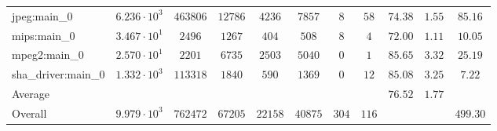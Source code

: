 \begin{tabular}{|l|c|c|c|c|c|c|c|c|c|c|}
jpeg:main\_0            & $ 6.236 \cdot 10^{3} $ & $ 463806 $ & $ 12786 $ & $ 4236  $ & $ 7857  $ & $ 8   $ & $ 58  $ & $ 74.38       $ & $ 1.55    $ & $ 85.16   $ \\
mips:main\_0            & $ 3.467 \cdot 10^{1} $ & $ 2496   $ & $ 1267  $ & $ 404   $ & $ 508   $ & $ 8   $ & $ 4   $ & $ 72.00       $ & $ 1.11    $ & $ 10.05   $ \\
mpeg2:main\_0           & $ 2.570 \cdot 10^{1} $ & $ 2201   $ & $ 6735  $ & $ 2503  $ & $ 5040  $ & $ 0   $ & $ 1   $ & $ 85.65       $ & $ 3.32    $ & $ 25.19   $ \\
sha\_driver:main\_0     & $ 1.332 \cdot 10^{3} $ & $ 113318 $ & $ 1840  $ & $ 590   $ & $ 1369  $ & $ 0   $ & $ 12  $ & $ 85.08       $ & $ 3.25    $ & $ 7.22    $ \\
\hline
Average                 & $                    $ & $        $ & $       $ & $       $ & $       $ & $     $ & $     $ & $ 76.52       $ & $ 1.77    $ & $         $ \\
\hline
Overall                 & $ 9.979 \cdot 10^{3} $ & $ 762472 $ & $ 67205 $ & $ 22158 $ & $ 40875 $ & $ 304 $ & $ 116 $ & $             $ & $         $ & $ 499.30  $ \\
\hline
\end{tabular}
